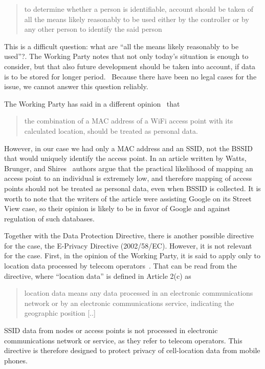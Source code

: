 \documentclass[12pt,a4paper,oneside,pdftex]{report}
\begin{document}
\begin{quote}
    to determine whether a person is identifiable, account should be taken of all the means likely reasonably to be used either by the controller or by any other person to identify the said person
\end{quote}

This is a difficult question: what are ``all the means likely reasonably to be used''?. The Working Party notes that not only today's situation is enough to consider, but that also future development should be taken into account, if data is to be stored for longer period.~\cite{wp29_136} Because there have been no legal cases for the issue, we cannot answer this question reliably.

The Working Party has said in a different opinion~\cite{wp29_185} that 
\begin{quote}
    the combination of a MAC address of a WiFi access point with its calculated location, should be treated as personal data.
\end{quote}

However, in our case we had only a MAC address and an SSID, not the BSSID that would uniquely identify the access point. In an article written by Watts, Brunger, and Shires~\cite{watts2011european} authors argue that the practical likelihood of mapping an access point to an individual is extremely low, and therefore mapping of access points should not be treated as personal data, even when BSSID is collected. It is worth to note that the writers of the article were assisting Google on its Street View case, so their opinion is likely to be in favor of Google and against regulation of such databases.

Together with the Data Protection Directive, there is another possible directive for the case, the E-Privacy Directive (2002/58/EC). However, it is not relevant for the case. First, in the opinion of the Working Party, it is said to apply only to location data processed by telecom operators~\cite{wp29_185}. That can be read from the directive, where ``location data'' is defined in Article 2(c) as

\begin{quote}
    location data means any data processed in an electronic communications network or by an electronic communications service, indicating the geographic position [..]
\end{quote} 

SSID data from nodes or access points is not processed in electronic communications network or service, as they refer to telecom operators. This directive is therefore designed to protect privacy of cell-location data from mobile phones.
\end{document}
